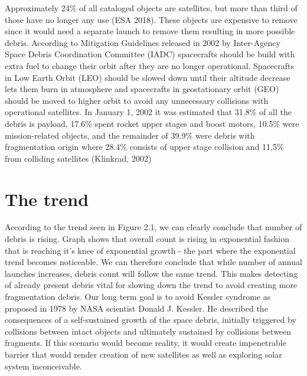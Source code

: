 \documentclass[12pt, a4paper, oneside]{book}
\begin{document}
Approximately 24\% of all cataloged objects are satellites, but more than third of those have no longer any use (ESA 2018).
These objects are expensive to remove since it would need a separate launch to remove them resulting in more possible debris.
According to Mitigation Guidelines released in 2002 by Inter-Agency Space Debris Coordination Committee (IADC) spacecrafts should be build with extra fuel to change their orbit after they are no longer operational.
Spacecrafts in Low Earth Orbit (LEO) should be slowed down until their altitude decrease lets them burn in atmosphere and spacecrafts in geostationary orbit (GEO) should be moved to higher orbit to avoid any unnecessary collisions with operational satellites.
In January 1, 2002 it was estimated that 31.8\% of all the debris is payload, 17.6\% spent rocket upper stages and boost motors, 10.5\% were mission-related objects, and the remainder of 39.9\% were debris with fragmentation origin where 28.4\% consists of upper stage collision and 11,5\% from colliding satellites (Klinkrad, 2002)

\section{The trend}


According to the trend seen in Figure 2.1, we can clearly conclude that number of debris is rising.
Graph shows that overall count is rising in exponential fashion that is reaching it's knee of exponential growth - the part where the exponential trend becomes noticeable.
We can therefore conclude that while number of annual launches increases, debris count will follow the same trend.
This makes detecting of already present debris vital for slowing down the trend to avoid creating more fragmentation debris.
Our long term goal is to avoid Kessler syndrome as proposed in 1978 by NASA scientist Donald J. Kessler.
He described the consequences of a self-sustained growth of the space debris, initially triggered by collisions between intact objects and ultimately sustained by collisions between fragments.
If this scenario would become reality, it would create impenetrable barrier that would render creation of new satellites as well as exploring solar system inconceivable.
\end{document}
